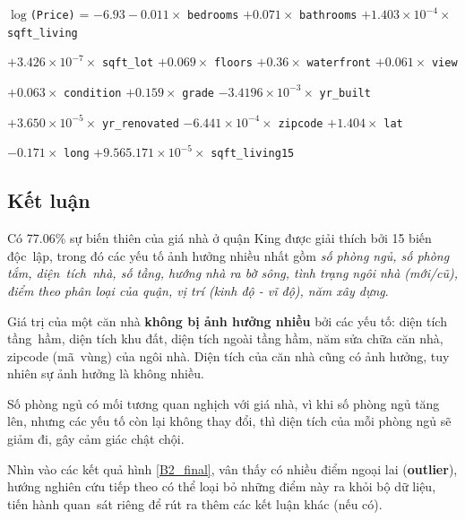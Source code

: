 \noindent $\log$\texttt{(Price)} = $-6.93 -0.011 \times$ \texttt{bedrooms} $+0.071\times$ \texttt{bathrooms} $+1.403\times 10^{-4} \times$ \texttt{sqft\_living}

\hspace{1.5cm} $+ 3.426\times10^{-7}\times$ \texttt{sqft\_lot} $+ 0.069\times$ \texttt{floors} $+ 0.36\times$ \texttt{waterfront} $+ 0.061\times$ \texttt{view}

\hspace{1.5cm}  $+ 0.063\times$ \texttt{condition} $+ 0.159\times$ \texttt{grade} $- 3.4196\times 10^{-3}\times$ \texttt{yr\_built}

\hspace{1.5cm} $+ 3.650\times 10^{-5}\times$ \texttt{yr\_renovated} $- 6.441 \times 10^{-4}\times$ \texttt{zipcode} $+ 1.404\times$ \texttt{lat}


\hspace{1.5cm}  $- 0.171\times$ \texttt{long} $+ 9.565.171\times 10^{-5}\times$ \texttt{sqft\_living15}

\subsection*{Kết luận}

Có 77.06\% sự biến thiên của giá nhà ở quận King được giải thích bởi 15 biến độc~lập, trong đó các yếu tố ảnh hưởng nhiều nhất gồm \textit{số phòng ngủ, số phòng tắm, diện~tích~nhà, số tầng, hướng nhà ra bờ sông, tình trạng ngôi nhà (mới/cũ), điểm theo phân loại của quận, vị trí (kinh độ - vĩ độ), năm xây dựng}.

Giá trị của một căn nhà \textbf{không bị ảnh hưởng nhiều} bởi các yếu tố: diện tích tầng~hầm, diện tích khu đất, diện tích ngoài tầng hầm, năm sửa chữa căn nhà, zipcode (mã~vùng) của ngôi nhà. Diện tích của căn nhà cũng có ảnh hưởng, tuy nhiên sự ảnh hưởng là không nhiều.

Số phòng ngủ có mối tương quan nghịch với giá nhà, vì khi số phòng ngủ tăng lên, nhưng các yếu tố còn lại không thay đổi, thì diện tích của mỗi phòng ngủ sẽ giảm đi, gây cảm giác chật chội. 

Nhìn vào các kết quả hình \ref{B2_final}, vân thấy có nhiều điểm ngoại lai (\textbf{outlier}), hướng nghiên cứu tiếp theo có thể loại bỏ những điểm này ra khỏi bộ dữ liệu, tiến hành quan~sát riêng để rút ra thêm các kết luận khác (nếu có).